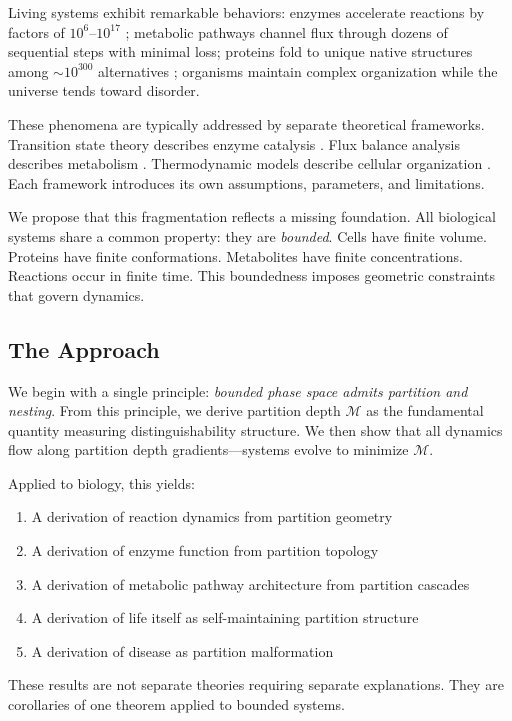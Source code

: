 ﻿\documentclass[twocolumn,10pt,a4paper]{article}
\theoremstyle{definition}
\theoremstyle{remark}
\newcommand{\Depth}{\mathcal{M}}
\begin{document}
Living systems exhibit remarkable behaviors: enzymes accelerate reactions by factors of $10^{6}$--$10^{17}$ \citep{wolfenden2001}; metabolic pathways channel flux through dozens of sequential steps with minimal loss; proteins fold to unique native structures among $\sim 10^{300}$ alternatives \citep{levinthal1969}; organisms maintain complex organization while the universe tends toward disorder.

These phenomena are typically addressed by separate theoretical frameworks. Transition state theory describes enzyme catalysis \citep{eyring1935}. Flux balance analysis describes metabolism \citep{orth2010}. Thermodynamic models describe cellular organization \citep{schrodinger1944}. Each framework introduces its own assumptions, parameters, and limitations.

We propose that this fragmentation reflects a missing foundation. All biological systems share a common property: they are \emph{bounded}. Cells have finite volume. Proteins have finite conformations. Metabolites have finite concentrations. Reactions occur in finite time. This boundedness imposes geometric constraints that govern dynamics.

\subsection{The Approach}

We begin with a single principle: \emph{bounded phase space admits partition and nesting}. From this principle, we derive partition depth $\Depth$ as the fundamental quantity measuring distinguishability structure. We then show that all dynamics flow along partition depth gradients---systems evolve to minimize $\Depth$.

Applied to biology, this yields:
\begin{enumerate}[label=(\roman*)]
    \item A derivation of reaction dynamics from partition geometry
    \item A derivation of enzyme function from partition topology
    \item A derivation of metabolic pathway architecture from partition cascades
    \item A derivation of life itself as self-maintaining partition structure
    \item A derivation of disease as partition malformation
\end{enumerate}

These results are not separate theories requiring separate explanations. They are corollaries of one theorem applied to bounded systems.
\end{document}
